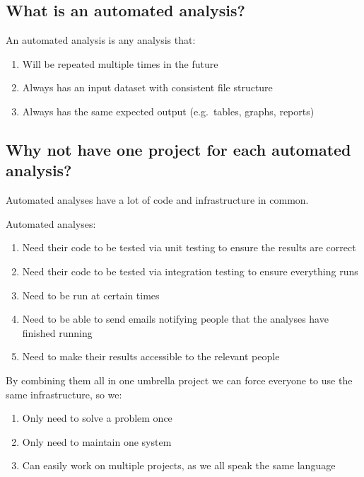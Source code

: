 \documentclass[12pt,]{article}
\providecommand{\tightlist}{%
  \setlength{\itemsep}{0pt}\setlength{\parskip}{0pt}}
\begin{document}
\subsection{What is an automated
analysis?}\label{what-is-an-automated-analysis-1}

An automated analysis is any analysis that:

\begin{enumerate}
\def\labelenumi{\arabic{enumi}.}
\tightlist
\item
  Will be repeated multiple times in the future
\item
  Always has an input dataset with consistent file structure
\item
  Always has the same expected output (e.g.~tables, graphs, reports)
\end{enumerate}

\subsection{Why not have one project for each automated
analysis?}\label{why-not-have-one-project-for-each-automated-analysis-1}

Automated analyses have a lot of code and infrastructure in common.

Automated analyses:

\begin{enumerate}
\def\labelenumi{\arabic{enumi}.}
\tightlist
\item
  Need their code to be tested via unit testing to ensure the results
  are correct
\item
  Need their code to be tested via integration testing to ensure
  everything runs
\item
  Need to be run at certain times
\item
  Need to be able to send emails notifying people that the analyses have
  finished running
\item
  Need to make their results accessible to the relevant people
\end{enumerate}

By combining them all in one umbrella project we can force everyone to
use the same infrastructure, so we:

\begin{enumerate}
\def\labelenumi{\arabic{enumi}.}
\tightlist
\item
  Only need to solve a problem once
\item
  Only need to maintain one system
\item
  Can easily work on multiple projects, as we all speak the same
  language
\end{enumerate}


\end{document}
